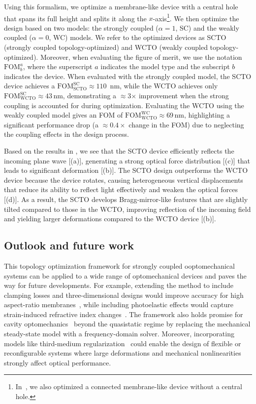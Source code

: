 Using this formalism, we optimize a membrane-like device with a central hole that spans its full height and splits it along the $x$-axis\footnote{In~\cite{ownpub5}, we also optimized a connected membrane-like device without a central hole.}. We then optimize the design based on two models: the strongly 
coupled ($\alpha = 1$, SC) and the weakly coupled ($\alpha = 0$, WC) models. We refer to the optimized devices as SCTO 
(strongly coupled topology-optimized) and WCTO (weakly coupled topology-optimized). Moreover, when evaluating the 
figure of merit, we use the notation $\text{FOM}^a_b$, where the superscript $a$ indicates the model type and the subscript $b$ indicates the device. 
When evaluated with the strongly coupled model, the SCTO device achieves a $\text{FOM}^\text{SC}_\text{SCTO}\approx 110$\, nm, while the WCTO achieves only
$\text{FOM}^\text{SC}_\text{WCTO}\approx 43$\,nm, demonstrating a $\approx$3$\times$ improvement when the strong coupling
 is accounted for during optimization. Evaluating the WCTO using the
 weakly coupled model gives an FOM of $\text{FOM}^\text{WC}_\text{WCTO}\approx$69\,nm, highlighting
 a significant performance drop (a $\approx 0.4 \times$ change in the FOM) due to neglecting the coupling effects in the design process. 
        
        
 Based on the results in , we see that the SCTO device efficiently reflects
 the incoming plane wave [(a)], generating a strong optical force distribution
 [(c)] that leads to significant deformation [(b)]. 
 The SCTO design outperforms the WCTO device because the device rotates, causing heterogeneous
 vertical displacements that reduce its ability to reflect light effectively and weaken the
 optical forces [(d)]. As a result, the SCTO develops Bragg-mirror-like features
 that are slightly tilted compared to those in the WCTO, improving reflection of the incoming field
 and yielding larger deformations compared to the WCTO device [(b)].
        

\subsection*{Outlook and future work}
This topology optimization framework for strongly coupled ooptomechanical systems can be applied to a wide
 range of optomechanical devices and paves the way for future developments. 
 For example, extending the method to include clamping losses and three-dimensional designs
  would improve accuracy for high aspect-ratio membranes~\cite{aspect_ratio}, while including
   photoelastic effects would capture strain-induced refractive index changes~\cite{photoelasticity}.
    The framework also holds promise for cavity optomechanics~\cite{cav_opt} beyond the quasistatic
     regime by replacing the mechanical steady-state model with a frequency-domain solver. 
     Moreover, incorporating models like third-medium regularization~\cite{HuHu0} could enable the design of
      flexible or reconfigurable systems where large deformations and mechanical nonlinearities
       strongly affect optical performance.

